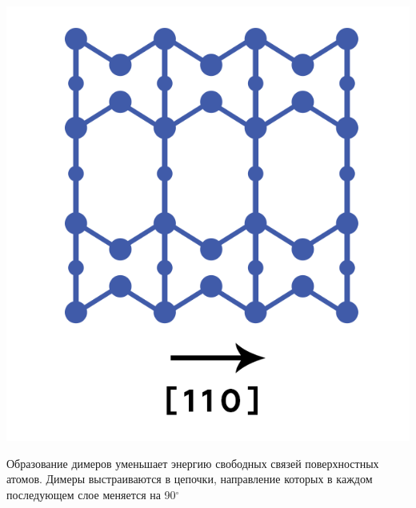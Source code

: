 \documentclass[10pt,pdf,hyperref={unicode}, dvipsnames]{beamer}
\begin{document}
\begin{frame}[t]
	\begin{minipage}{0.35\linewidth}
		\centering
		\includegraphics[width = .9\linewidth]{imgs/Dim.png}
	\end{minipage}
	\begin{minipage}{0.62\linewidth}
		Образование димеров уменьшает энергию свободных связей поверхностных атомов. Димеры выстраиваются в цепочки, 
		направление которых в каждом последующем слое меняется на 90$^\circ$
	\end{minipage}


\end{frame}
\end{document}
